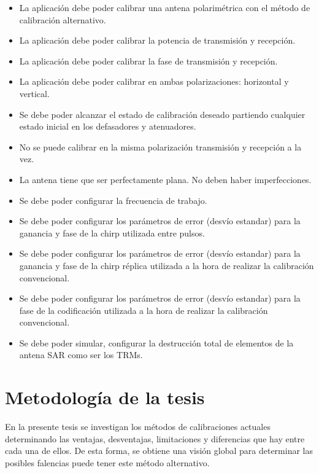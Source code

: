 \begin{itemize}
    \item La aplicación debe poder calibrar una antena polarimétrica con el método de calibración alternativo.
    
    \item La aplicación debe poder calibrar la potencia de transmisión y recepción.
    
    \item La aplicación debe poder calibrar la fase de transmisión y recepción.
    
    \item La aplicación debe poder calibrar en ambas polarizaciones: horizontal y vertical.
    
    \item Se debe poder alcanzar el estado de calibración deseado partiendo cualquier estado inicial en los defasadores y 
			atenuadores.
    
    \item No se puede calibrar en la misma polarización transmisión y recepción a la vez.
    
    \item La antena tiene que ser perfectamente plana. No deben haber imperfecciones.
           
    \item Se debe poder configurar la frecuencia de trabajo.

    \item Se debe poder configurar los parámetros de error (desvío estandar) para la ganancia y fase de la chirp utilizada 
			entre pulsos.

    \item Se debe poder configurar los parámetros de error (desvío estandar) para la ganancia y fase de la chirp réplica 
			utilizada a la hora de realizar la calibración convencional.
    
    \item Se debe poder configurar los parámetros de error (desvío estandar) para la fase de la codificación utilizada a la 
			hora de realizar la calibración convencional.

    \item Se debe poder simular, configurar la destrucción total de elementos de la antena SAR como ser los TRMs.
\end{itemize}


\section{Metodología de la tesis}
En la presente tesis se investigan los métodos de calibraciones actuales determinando las ventajas, desventajas, 
limitaciones y diferencias que hay entre cada una de ellos. De esta forma, se obtiene una visión global para 
determinar las posibles falencias puede tener este método alternativo.

